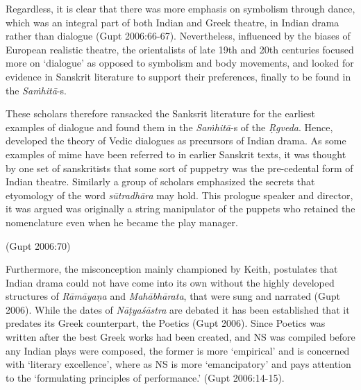 Regardless, it is clear that there was more emphasis on symbolism through dance, which was an integral part of both Indian and Greek theatre, in Indian drama rather than dialogue (Gupt 2006:66-67). Nevertheless, influenced by the biases of European realistic theatre, the orientalists of late 19th and 20th centuries focused more on ‘dialogue’ as opposed to symbolism and body movements, and looked for evidence in Sanskrit literature to support their preferences, finally to be found in the \textsl{Saṁhitā}-s. 

\begin{myquote}
These scholars therefore ransacked the Sanksrit literature for the earliest examples of dialogue and found them in the \textsl{Saṁhitā}-s of the \textsl{Ṛgveda}. Hence, developed the theory of Vedic dialogues as precursors of Indian drama. As some examples of mime have been referred to in earlier Sanskrit texts, it was thought by one set of sanskritists that some sort of puppetry was the pre-cedental form of Indian theatre. Similarly a group of scholars emphasized the secrets that etyomology of the word \textsl{sūtradhāra} may hold. This prologue speaker and director, it was argued was originally a string manipulator of the puppets who retained the nomenclature even when he became the play manager. 

\hfill (Gupt 2006:70)
\end{myquote}

Furthermore, the misconception mainly championed by Keith, postulates that Indian drama could not have come into its own without the highly developed structures of \textsl{Rāmāyaṇa} and \textsl{Mahābhārata}, that were sung and narrated (Gupt 2006). While the dates of \textsl{Nāṭyaśāstra} are debated it has been established that it predates its Greek counterpart, the Poetics (Gupt 2006). Since Poetics was written after the best Greek works had been created, and NS was compiled before any Indian plays were composed, the former is more ‘empirical’ and is concerned with ‘literary excellence’, where as NS is more ‘emancipatory’ and pays attention to the ‘formulating principles of performance.’ (Gupt 2006:14-15). 

